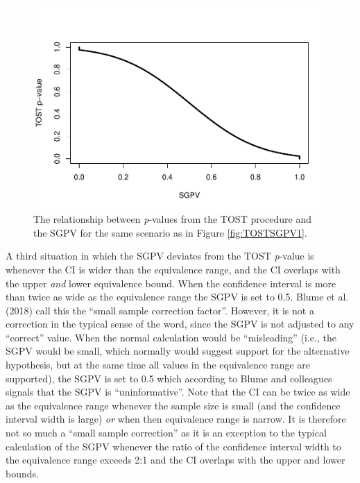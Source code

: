 \documentclass[,man,floatsintext]{apa6}
\begin{document}
\begin{figure}
\centering
\includegraphics{manuscript_files/figure-latex/TOSTSGPV5-1.pdf}
\caption{\label{fig:TOSTSGPV5}The relationship between \emph{p}-values from the TOST procedure and the SGPV for the same scenario as in Figure \ref{fig:TOSTSGPV1}.}
\end{figure}

A third situation in which the SGPV deviates from the TOST \emph{p}-value is whenever the CI is wider than the equivalence range, and the CI overlaps with the upper \emph{and} lower equivalence bound. When the confidence interval is more than twice as wide as the equivalence range the SGPV is set to 0.5. Blume et al. (2018) call this the \enquote{small sample correction factor}. However, it is not a correction in the typical sense of the word, since the SGPV is not adjusted to any \enquote{correct} value. When the normal calculation would be \enquote{misleading} (i.e., the SGPV would be small, which normally would suggest support for the alternative hypothesis, but at the same time all values in the equivalence range are supported), the SGPV is set to 0.5 which according to Blume and colleagues signals that the SGPV is \enquote{uninformative}. Note that the CI can be twice as wide as the equivalence range whenever the sample size is small (and the confidence interval width is large) \emph{or} when then equivalence range is narrow. It is therefore not so much a \enquote{small sample correction} as it is an exception to the typical calculation of the SGPV whenever the ratio of the confidence interval width to the equivalence range exceeds 2:1 and the CI overlaps with the upper and lower bounds.
\end{document}
